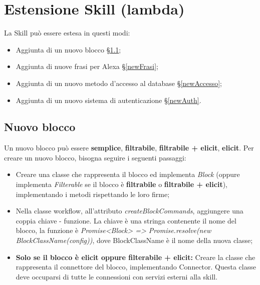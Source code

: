 \section{Estensione Skill (lambda)}
La Skill può essere estesa in questi modi:
\begin{itemize}
    \item Aggiunta di un nuovo blocco \S\ref{newBlock};
    \item Aggiunta di nuove frasi per Alexa \S\ref{newFrasi};
    \item Aggiunta di un nuovo metodo d'accesso al database \S\ref{newAccesso};
    \item Aggiunta di un nuovo sistema di autenticazione \S\ref{newAuth}.
\end{itemize}
\subsection{Nuovo blocco}\label{newBlock}
Un nuovo blocco può essere \textbf{semplice}, \textbf{filtrabile}, \textbf{filtrabile + elicit}, \textbf{elicit}.
Per creare un nuovo blocco, bisogna seguire i seguenti passaggi:
\begin{itemize}
  \item Creare una classe che rappresenta il blocco ed implementa \textit{Block} (oppure implementa \textit{Filterable} se il blocco è \textbf{filtrabile} o \textbf{filtrabile + elicit}), implementando i metodi rispettando le loro firme;
  \item Nella classe workflow, all'attributo \textit{createBlockCommands}, aggiungere una coppia chiave - funzione. La chiave è una stringa contenente il nome del blocco, la funzione è \textit{Promise<Block> => Promise.resolve(new BlockClassName(config))}, dove BlockClassName è il nome della nuova classe;
  \item \textbf{Solo se il blocco è elicit oppure filterabile + elicit:} Creare la classe che rappresenta il connettore del blocco, implementando Connector. Questa classe deve occuparsi di tutte le connessioni con servizi esterni alla skill.
\end{itemize}

